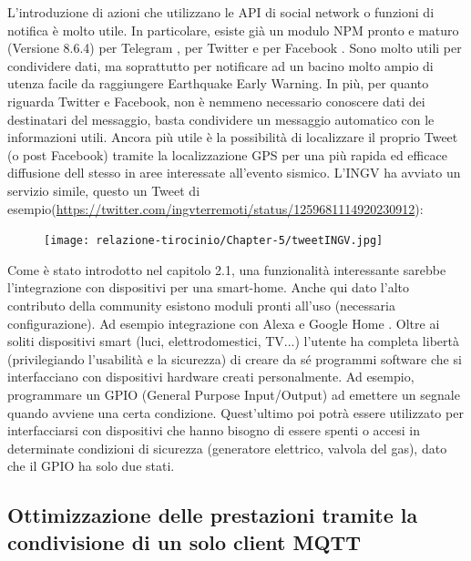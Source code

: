 \documentclass[a4paper,10pt]{memoir}
\begin{document}
L'introduzione di azioni che utilizzano le API di social network o funzioni di notifica è molto utile. In particolare, esiste già un modulo NPM pronto e maturo (Versione 8.6.4) per Telegram \cite{telegram-node}, per Twitter \cite{twitter-node} e per Facebook \cite{facebook-node}.
Sono molto utili per condividere dati, ma soprattutto per notificare ad un bacino molto ampio di utenza facile da raggiungere Earthquake Early Warning. In più, per quanto riguarda Twitter e Facebook, non è nemmeno necessario conoscere dati dei destinatari del messaggio, basta condividere un messaggio automatico con le informazioni utili. Ancora più utile è la possibilità di localizzare il proprio Tweet (o post Facebook) tramite la localizzazione GPS per una più rapida ed efficace diffusione dell stesso in aree interessate all'evento sismico.
L'INGV ha avviato un servizio simile, questo un Tweet di esempio(\href{https://twitter.com/ingvterremoti/status/1259681114920230912}{https://twitter.com/ingvterremoti/status/1259681114920230912}):
\begin{figure}[ht]
    \centering
    \texttt{[image: relazione-tirocinio/Chapter-5/tweetINGV.jpg]}
    \label{fig:tweetINGV}
\end{figure}

Come è stato introdotto nel capitolo 2.1, una funzionalità interessante sarebbe l'integrazione con dispositivi per una smart-home. Anche qui dato l'alto contributo della community esistono moduli pronti all'uso (necessaria configurazione). Ad esempio integrazione con Alexa \cite{alexa} e Google Home \cite{google-home}.
Oltre ai soliti dispositivi smart (luci, elettrodomestici, TV...) l'utente ha completa libertà (privilegiando l'usabilità e la sicurezza) di creare da sé programmi software che si interfacciano con dispositivi hardware creati personalmente. Ad esempio, programmare un GPIO (General Purpose Input/Output) ad emettere un segnale quando avviene una certa condizione. Quest'ultimo poi potrà essere utilizzato per interfacciarsi con dispositivi che hanno bisogno di essere spenti o accesi in determinate condizioni di sicurezza (generatore elettrico, valvola del gas), dato che il GPIO ha solo due stati.

\subsection{Ottimizzazione delle prestazioni tramite la condivisione di un solo client MQTT}
\end{document}
